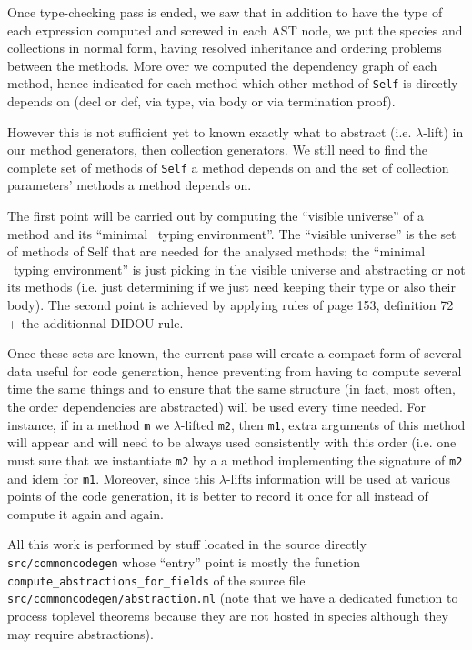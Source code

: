 \label{intermediate-abstractions}
Once type-checking pass is ended, we saw that in addition to have the
type of each expression computed and screwed in each AST node, we put
the species and collections in normal form, having resolved
inheritance and ordering problems between the methods. More over we
computed the dependency graph of each method, hence indicated for each
method which other method of {\tt Self} is directly depends on (decl
or def, via type, via body or via termination proof).

However this is not sufficient yet to known exactly what to abstract
(i.e. $\lambda$-lift) in our method generators, then collection
generators. We still need to find the complete set of methods of
{\tt Self} a method depends on and the set of collection parameters'
methods a method depends on.

The first point will be carried out by computing the ``visible
universe'' of a method and its ``minimal \coq\ typing
environment''. The ``visible universe'' is the set of methods of Self
that are needed for the analysed methods; the ``minimal \coq\ typing
environment'' is just picking in the visible universe and abstracting
or not its methods (i.e. just determining if we just need keeping
their type or also their body).
The second point is achieved by applying rules of page
153, definition 72 + the additionnal DIDOU rule.

Once these sets are known, the current
pass will create a compact form of several data useful for code
generation, hence preventing from having to compute several time the
same things and to ensure that the same structure (in fact, most
often, the order dependencies are abstracted) will be used every time
needed. For instance, if in a method {\tt m} we $\lambda$-lifted
{\tt m2}, then {\tt m1}, extra arguments of this method will appear
and will need to be always used consistently with this order (i.e. one
must sure that we instantiate {\tt m2} by a a method implementing the
signature of {\tt m2} and idem for {\tt m1}. Moreover, since this
$\lambda$-lifts information will be used at various points of the code
generation, it is better to record it once for all instead of compute
it again and again.

All this work is performed by stuff located in the source directly
{\tt src/commoncodegen} whose ``entry'' point is mostly the function
{\tt compute\_abstractions\_for\_fields} of the source file
{\tt src/commoncodegen/abstraction.ml} (note that we have a dedicated
function to process toplevel theorems because they are not hosted in
species although they may require abstractions).

